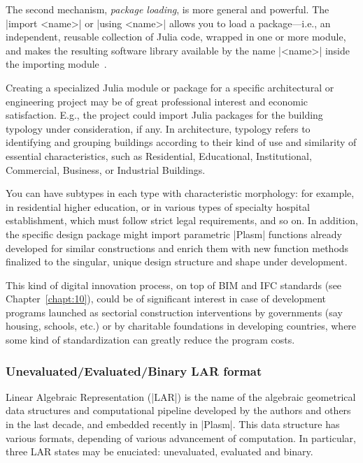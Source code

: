 \begin{coding}
The second mechanism, \emph{package loading}, is more general and powerful. The |import <name>| or |using <name>| allows you to load a package—i.e., an independent, reusable collection of Julia code, wrapped in one or more module, and makes the resulting software library available by the name |<name>| inside the importing module~\cite{}. 

\begin{remark}
Creating a specialized Julia module or package for a specific architectural or engineering  project may be of great professional interest and economic satisfaction. 
E.g., the project could import Julia packages for the building typology under consideration, if any. In architecture, typology refers to identifying and grouping buildings according to their kind of use and similarity of essential characteristics, such as Residential, Educational, Institutional, Commercial, Business, or Industrial Buildings.
\end{remark}

\begin{remark}
You can have subtypes in each type with characteristic morphology: for example, in residential higher education, or in various types of specialty hospital establishment, which must follow strict legal requirements, and so on.
In addition, the specific design package might import parametric |Plasm| functions already developed for similar constructions and enrich them with new function methods finalized to the singular, unique design structure and shape under development.
\end{remark}

This kind of digital innovation process, on top of BIM and IFC standards (see Chapter~\ref{chapt:10}), could be of significant interest in case of development programs launched as sectorial construction interventions by governments (say housing, schools, etc.) or by charitable foundations in developing countries, where some kind of standardization can greatly reduce the program costs.
 

\subsubsection*{Unevaluated/Evaluated/Binary LAR format}\label{sect:4-6-2}

Linear Algebraic Representation (|LAR|) is the name of the algebraic geometrical data structures and computational pipeline developed by the authors and others in the last decade, and embedded recently in |Plasm|. This data structure has various formats, depending of various advancement of computation. In particular, three LAR states may be enuciated: unevaluated, evaluated and binary.
 \begin{description}
 

\end{description}
\end{coding}

